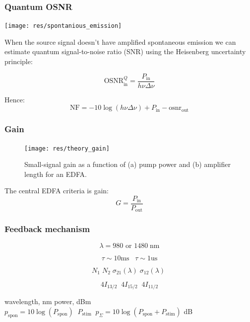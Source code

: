 \documentclass{beamer}
\begin{document}
\begin{frame}
	\frametitle{Quantum OSNR}
	\texttt{[image: res/spontanious\_emission]}
	
	\footnotesize
	When the source signal doesn't have amplified spontaneous emission we can estimate quantum signal-to-noise ratio (SNR) using the Heisenberg uncertainty principle:
	
	$$\text{OSNR}_{\text{in}}^Q = \frac{P_{\text{in}}}{h \nu \Delta\nu}$$

	Hence:
	$$\text{NF} = -10\log{(h \nu \Delta\nu)} + P_{\text{in}} - \text{osnr}_{\text{out}}$$
	
\end{frame}

\begin{frame}
	\frametitle{Gain}
	\begin{figure}
		\footnotesize
		\centering
		\texttt{[image: res/theory\_gain]}
		\vspace{-5pt}
		\footnotesize
		\caption{\footnotesize Small-signal gain as a function of (a) pump power and (b) amplifier length for an EDFA. }
	\end{figure}

	The central EDFA criteria is gain:
	$$G = \frac{P_{\text{in}}}{P_{\text{out}}}$$

\end{frame}


	
\begin{frame}
	\frametitle{Feedback mechanism}
	
	
	$$\lambda = 980 \text{ or } 1480\; \text{nm}$$
	
	$$\tau \sim 10 \text{ms} \;\;\; \tau \sim 1 \text{us}$$
	
	$$N_1 \; N_2 \; \sigma_{21}(\lambda) \; \sigma_{12}(\lambda) \;$$
	
	$$4I_{13/2} \;\; 4I_{15/2}\;\; 4I_{11/2}$$
	
	wavelength, nm power, dBm $p_{\text{spon}} = 10\log{\left(P_{\text{spon}}\right)}\;\; P_{\text{stim}} \;\; p_{\Sigma} = 10\log{\left(P_{\text{spon}} + P_{\text{stim}} \right)} $
	dB
\end{frame}

	
\end{document}
